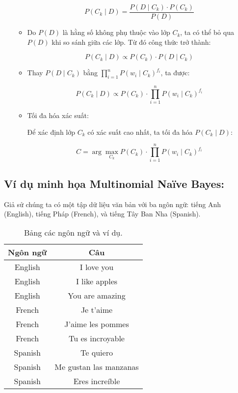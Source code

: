 \begin{enumerate}
\begin{itemize}
\[
P(C_k \mid D) = \frac{P(D \mid C_k) \cdot P(C_k)}{P(D)}
\]

    \item Do \( P(D) \) là hằng số không phụ thuộc vào lớp \( C_k \), ta có thể bỏ qua \( P(D) \) khi so sánh giữa các lớp. Từ đó công thức trở thành:

\[
P(C_k \mid D) \propto P(C_k) \cdot P(D \mid C_k)
\]

    \item Thay \( P(D \mid C_k) \) bằng \( \prod_{i=1}^{n} P(w_i \mid C_k)^{f_i} \), ta được:

\[
P(C_k \mid D) \propto P(C_k) \cdot \prod_{i=1}^{n} P(w_i \mid C_k)^{f_i}
\]

    \item Tối đa hóa xác suất:

Để xác định lớp \( C_k \) có xác suất cao nhất, ta tối đa hóa \( P(C_k \mid D) \):

\[
\hat{C} = \arg\max_{C_k} P(C_k) \cdot \prod_{i=1}^{n} P(w_i \mid C_k)^{f_i}
\]

\end{itemize}

\end{enumerate}
\clearpage
\subsection{Ví dụ minh họa Multinomial Naïve Bayes:}

Giả sử chúng ta có một tập dữ liệu văn bản với ba ngôn ngữ: tiếng Anh (English), tiếng Pháp (French), và tiếng Tây Ban Nha (Spanish).

\begin{table}[H]
\centering
\begin{tabular}{|c|c|}
\hline
\textbf{Ngôn ngữ} & \textbf{Câu} \\
\hline
English & I love you \\
English & I like apples \\
English & You are amazing \\
French & Je t'aime \\
French & J'aime les pommes \\
French & Tu es incroyable \\
Spanish & Te quiero \\
Spanish & Me gustan las manzanas \\
Spanish & Eres increíble \\
\hline
\end{tabular}
\caption{Bảng các ngôn ngữ và ví dụ.}
\end{table}

